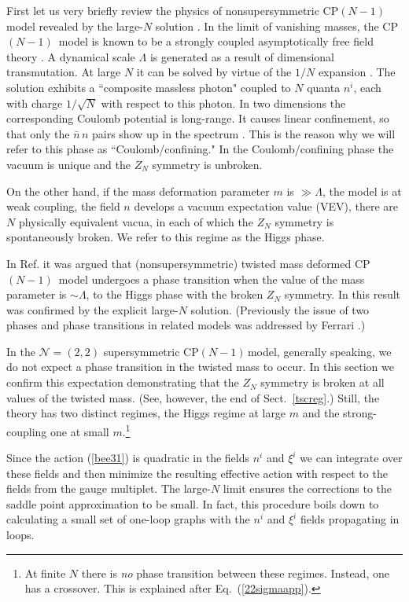 \documentclass[epsfig,12pt]{article}
\newcommand{\cpn}{CP$(N-1)\,$}
\newcommand{\ntwot}{${\mathcal N}= \left(2,2\right) $ }
\begin{document}
First let us very briefly review the physics of nonsupersymmetric \cpn model revealed
by the large-$N$ solution \cite{GSYphtr}.
In the limit of vanishing masses, the \mbox{\cpn} model is known to 
be a strongly coupled asymptotically free
field theory
\cite{BelPo}. A dynamical scale $\Lambda$ is generated as a result of
dimensional transmutation.
At large $N$ it can be solved by virtue of the $1/N$ expansion
\cite{W79}.
The solution  exhibits a ``composite massless photon"
coupled to $N$ quanta $n^i$, each with charge $1/\sqrt N$ with respect
to this photon. In two dimensions the corresponding Coulomb potential is long-range.
It causes linear confinement, so that only the $\bar n\,n$ pairs show up in the
spectrum \cite{Coleman,W79}. This is the reason why we will refer to this phase as
``Coulomb/confining." In the Coulomb/confining phase the vacuum 
is unique and the $Z_N$ symmetry is unbroken.

On the other hand, if the mass deformation parameter $m$ is $\gg\Lambda$,
the model is at weak coupling, the field $n$ develops a vacuum
expectation value (VEV),
there are $N$ physically equivalent vacua, in each of which the
$Z_N$ symmetry is spontaneously broken. We  refer to this regime
as the
Higgs phase.

In Ref. \cite{GSY05}
it was argued that (nonsupersymmetric) twisted mass deformed \mbox{\cpn} model
undergoes a phase transition when the value of the mass parameter is
$\sim \Lambda$, to the Higgs phase with the broken $Z_N$ symmetry.
 In \cite{GSYphtr} this result was confirmed by the explicit
 large-$N$ solution. (Previously
the issue of two phases and phase transitions in related models
was  addressed by Ferrari
\cite{Ferrari,Ferrari2}.)

In the \ntwot supersymmetric \cpn model, generally speaking,  we do not expect a phase transition
in the 
twisted mass to occur.  In this section we confirm this expectation demonstrating
that the $Z_N$ symmetry is  broken at all values of the twisted mass. 
(See, however, the end of Sect.~\ref{tscreg}.)
Still, the theory has two 
distinct regimes, the Higgs regime at large $m$ and the  strong-coupling one 
at small $m$.\footnote{At finite $N$ there is {\em no} phase transition between these regimes. Instead, one has a crossover. This is explained after Eq.~(\ref{22sigmaapp}).}

Since the action (\ref{bee31}) is quadratic in the fields $n^{i}$ and $\xi^i$
we can integrate over these fields and then minimize the resulting
effective action with respect to the  fields from the gauge multiplet. The large-$N$ limit ensures the corrections to the saddle point approximation to be  small. In fact,
this procedure boils down to calculating a small set of one-loop graphs with the
$n^{i}$ and $\xi^i$  fields propagating in loops.
\end{document}
